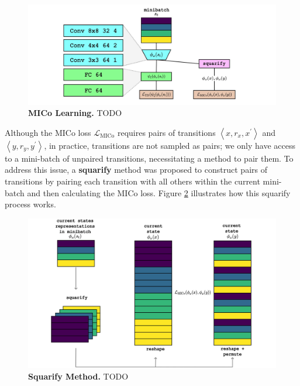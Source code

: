 \begin{figure}[h]
    \centering
    \includegraphics[width=1\linewidth]{Figures/mico_learning.jpg}
    \caption[MICo Learning]{\textbf{MICo Learning.} TODO}
    \label{fig:mico_learning}
\end{figure}


Although the MICo loss $\mathcal{L}_{\text{MICo}}$ requires pairs of transitions $\left\langle x, r_x, x^{\prime}\right\rangle$ and $\left\langle y, r_y, y^{\prime}\right\rangle$, in practice, transitions are not sampled as pairs; we only have access to a mini-batch of unpaired transitions, necessitating a method to pair them. To address this issue, a \textbf{squarify} method \cite{castro2020scalable} was proposed to construct pairs of transitions by pairing each transition with all others within the current mini-batch and then calculating the MICo loss. Figure \ref{fig:squarify} illustrates how this squarify process works.

\begin{figure}[H]
    \centering
    \includegraphics[width=1\linewidth]{Figures/squarify.jpg}
    \caption[Squarify Method]{\textbf{Squarify Method.} TODO}
    \label{fig:squarify}
\end{figure}

